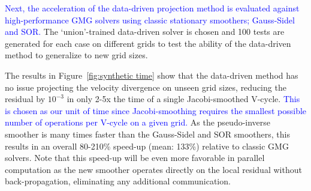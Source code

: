 \documentclass[review]{elsarticle}
\begin{document}
\textcolor{blue}{Next, the acceleration of the data-driven projection method is evaluated against high-performance GMG solvers using classic stationary smoothers; Gauss-Sidel and SOR.} The `union'-trained data-driven solver is chosen and 100 tests are generated for each case on different grids to test the ability of the data-driven method to generalize to new grid sizes.

The results in Figure~\ref{fig:synthetic time} show that the data-driven method has no issue projecting the velocity divergence on unseen grid sizes, reducing the residual by $10^{-3}$ in only 2-5x the time of a single Jacobi-smoothed V-cycle. \textcolor{blue}{This is chosen as our unit of time since Jacobi-smoothing requires the smallest possible number of operations per V-cycle on a given grid.} As the pseudo-inverse smoother is many times faster than the Gauss-Sidel and SOR smoothers, this results in an overall 80-210\% speed-up (mean: 133\%) relative to classic GMG solvers. Note that this speed-up will be even more favorable in parallel computation as the new smoother operates directly on the local residual without back-propagation, eliminating any additional communication.
\end{document}
